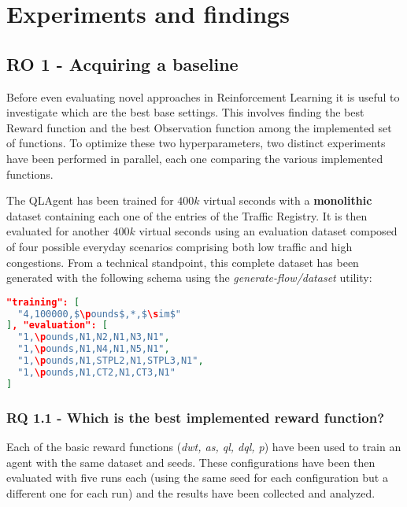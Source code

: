 \chapter{Experiments and findings}

\section{RO 1 - Acquiring a baseline}
  
  Before even evaluating novel approaches in Reinforcement Learning it is useful to investigate which are the best base settings. This involves finding the best Reward function and the best Observation function among the implemented set of functions. To optimize these two hyperparameters, two distinct experiments have been performed in parallel, each one comparing the various implemented functions.

  The QLAgent has been trained for $400k$ virtual seconds with a \textbf{monolithic} dataset containing each one of the entries of the Traffic Registry. It is then evaluated for another $400k$ virtual seconds using an evaluation dataset composed of four possible everyday scenarios comprising both low traffic and high congestions. From a technical standpoint, this complete dataset has been generated with the following schema using the \textit{generate-flow/dataset} utility:

\noindent
\begin{minipage}{\linewidth}
\begin{lstlisting}[language=JSON, caption=The schema for the "Monolithic" Dataset, label={lst:dataset-schema-monolithic}, mathescape=true]
"training": [
  "4,100000,$\pounds$,*,$\sim$"
], "evaluation": [
  "1,\pounds,N1,N2,N1,N3,N1",
  "1,\pounds,N1,N4,N1,N5,N1",
  "1,\pounds,N1,STPL2,N1,STPL3,N1",
  "1,\pounds,N1,CT2,N1,CT3,N1"
]
\end{lstlisting}
\end{minipage}

\subsection{RQ 1.1 - Which is the best implemented reward function?}

Each of the basic reward functions (\textit{dwt, as, ql, dql, p}) have been used to train an agent with the same dataset and seeds.
These configurations have been then evaluated with five runs each (using the same seed for each configuration but a different one for each run) and the results have been collected and analyzed.

